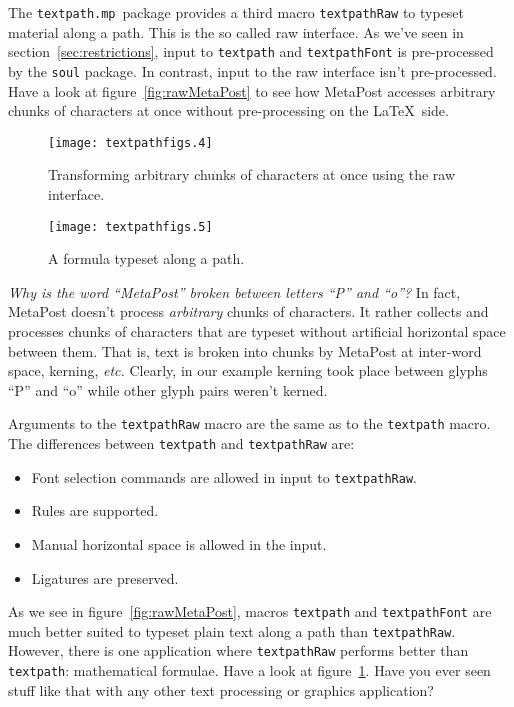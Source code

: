 \documentclass{article}
\newcommand*{\cmd}[1]{\texttt{#1}}
\newcommand*{\pkg}{\cmd{textpath.mp}}
\newcommand{\user}[1]{\emph{#1}}
\begin{document}
The \pkg\ package provides a third macro \cmd{textpathRaw} to typeset material along a path.  This is the so called raw interface.  As we've seen in section~\ref{sec:restrictions}, input to \cmd{textpath} and \cmd{textpathFont} is pre-processed by the \cmd{soul} package.  In contrast, input to the raw interface isn't pre-processed.  Have a look at figure~\ref{fig:rawMetaPost} to see how MetaPost accesses arbitrary chunks of characters at once without pre-processing on the \LaTeX\ side.

\begin{figure}
\begin{minipage}[t]{.45\linewidth}
  \centering
  \texttt{[image: textpathfigs.4]}
  \caption{Transforming arbitrary chunks of characters at once using the raw interface.}
  \label{fig:rawMetaPost}
\end{minipage}\hfill
\begin{minipage}[t]{.45\linewidth}
  \centering
  \texttt{[image: textpathfigs.5]}
  \caption{A formula typeset along a path.}
  \label{fig:rawFormula}
\end{minipage}
\end{figure}

\user{Why is the word ``MetaPost'' broken between letters ``P'' and ``o''?}  In fact, MetaPost doesn't process \emph{arbitrary} chunks of characters.  It rather collects and processes chunks of characters that are typeset without artificial horizontal space between them.  That is, text is broken into chunks by MetaPost at inter-word space, kerning, \emph{etc.}  Clearly, in our example kerning took place between glyphs ``P'' and ``o'' while other glyph pairs weren't kerned.

Arguments to the \cmd{textpathRaw} macro are the same as to the \cmd{textpath} macro.  The differences between \cmd{textpath} and \cmd{textpathRaw} are:
\begin{itemize}
\item Font selection commands are allowed in input to \cmd{textpathRaw}.
\item Rules are supported.
\item Manual horizontal space is allowed in the input.
\item Ligatures are preserved.
\end{itemize}

As we see in figure~\ref{fig:rawMetaPost}, macros \cmd{textpath} and \cmd{textpathFont} are much better suited to typeset plain text along a path than \cmd{textpathRaw}.  However, there is one application where \cmd{textpathRaw} performs better than \cmd{textpath}: mathematical formulae.  Have a look at figure~\ref{fig:rawFormula}.  Have you ever seen stuff like that with any other text processing or graphics application?
\end{document}
